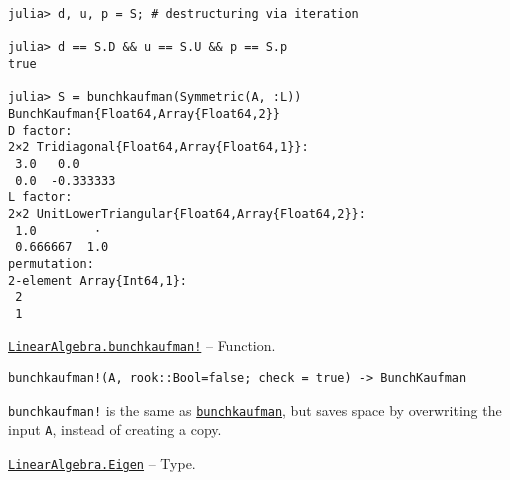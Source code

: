 \begin{adjustwidth}{2em}{0pt}
\begin{verbatim}
julia> d, u, p = S; # destructuring via iteration

julia> d == S.D && u == S.U && p == S.p
true

julia> S = bunchkaufman(Symmetric(A, :L))
BunchKaufman{Float64,Array{Float64,2}}
D factor:
2×2 Tridiagonal{Float64,Array{Float64,1}}:
 3.0   0.0
 0.0  -0.333333
L factor:
2×2 UnitLowerTriangular{Float64,Array{Float64,2}}:
 1.0        ⋅
 0.666667  1.0
permutation:
2-element Array{Int64,1}:
 2
 1
\end{verbatim}



\end{adjustwidth}
\hypertarget{12377977453211508613}{} 
\hyperlink{12377977453211508613}{\texttt{LinearAlgebra.bunchkaufman!}}  -- {Function.}

\begin{adjustwidth}{2em}{0pt}


\begin{verbatim}
bunchkaufman!(A, rook::Bool=false; check = true) -> BunchKaufman
\end{verbatim}

\texttt{bunchkaufman!} is the same as \hyperlink{17253210517333433448}{\texttt{bunchkaufman}}, but saves space by overwriting the input \texttt{A}, instead of creating a copy.



\end{adjustwidth}
\hypertarget{2476442734611677039}{} 
\hyperlink{2476442734611677039}{\texttt{LinearAlgebra.Eigen}}  -- {Type.}

